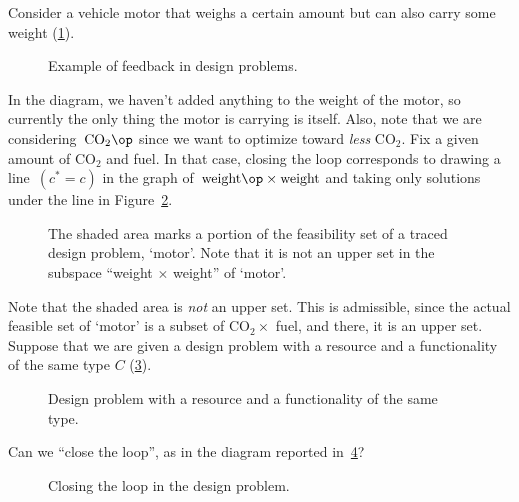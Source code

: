 \begin{example}Consider a vehicle motor that weighs a certain amount but can also carry some weight (\cref{fig:examplefeedback}).
\begin{figure}[h!]
\begin{center}
\end{center}
\caption{Example of feedback in design problems. \label{fig:examplefeedback}}
\end{figure}
In the diagram, we haven't added anything to the weight of the motor, so currently the only thing the motor is carrying is itself. Also, note that we are considering~$\text{CO}_2\op$ since we want to optimize toward \emph{less} CO$_2$. Fix a given amount of CO$_2$ and fuel. In that case, closing the loop corresponds to drawing a line~$(c^\ast = c)$ in the graph of~$\text{weight}\op \times \text{weight}$ and taking only solutions under the line in Figure~\ref{fig:weightcarrier}.
\end{example}
\begin{figure}[h!]
\centering
{}
\caption{The shaded area marks a portion of the feasibility set of a traced design problem, `motor'. Note that it is not an upper set in the subspace ``weight $\times$ weight'' of `motor'.}
\label{fig:weightcarrier}
\end{figure}

Note that the shaded area is \emph{not} an upper set. This is admissible, since the actual feasible set of `motor' is a subset of CO$_2 \times$ fuel, and there, it is an upper set.
Suppose that we are given a design problem with a resource and a functionality of the same type $C$ (\cref{fig:extrace_1}).

\begin{figure}[h!]
\begin{center}
\end{center}
\caption{Design problem with a resource and a functionality of the same type. \label{fig:extrace_1}}
\end{figure}

Can we ``close the loop'', as in the diagram reported in~\cref{fig:extrace_2}?
\begin{figure}[h!]
\begin{center}
\end{center}
\caption{Closing the loop in the design problem. \label{fig:extrace_2}}
\end{figure}

